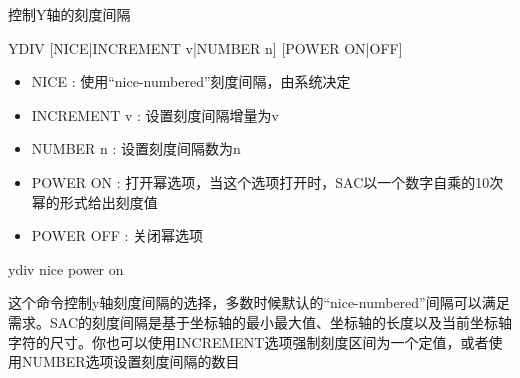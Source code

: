 \label{cmd:ydiv}

控制Y轴的刻度间隔

\begin{SACSTX}
YDIV [NICE|INCREMENT v|NUMBER n] [POWER ON|OFF]
\end{SACSTX}

\begin{itemize}
\item NICE : 使用``nice-numbered''刻度间隔，由系统决定 
\item INCREMENT v : 设置刻度间隔增量为v  
\item NUMBER n : 设置刻度间隔数为n  
\item POWER ON : 打开幂选项，当这个选项打开时，SAC以一个数字自乘的10次幂的形式给出刻度值 
\item POWER OFF : 关闭幂选项 
\end{itemize}

\begin{SACDFT}
ydiv nice power on
\end{SACDFT}

这个命令控制y轴刻度间隔的选择，多数时候默认的``nice-numbered''间隔可以满足需求。SAC的刻度间隔是基于坐标轴的最小最大值、坐标轴的长度以及当前坐标轴字符的尺寸。你也可以使用INCREMENT选项强制刻度区间为一个定值，或者使用NUMBER选项设置刻度间隔的数目
